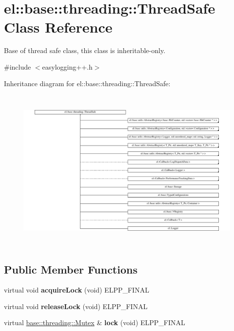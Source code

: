 \hypertarget{classel_1_1base_1_1threading_1_1ThreadSafe}{\section{el\-:\-:base\-:\-:threading\-:\-:Thread\-Safe Class Reference}
\label{classel_1_1base_1_1threading_1_1ThreadSafe}
}


Base of thread safe class, this class is inheritable-\/only.  




{\ttfamily \#include $<$easylogging++.\-h$>$}

Inheritance diagram for el\-:\-:base\-:\-:threading\-:\-:Thread\-Safe\-:\begin{figure}[H]
\begin{center}
\leavevmode
\includegraphics[height=8.203125cm]{classel_1_1base_1_1threading_1_1ThreadSafe}
\end{center}
\end{figure}
\subsection*{Public Member Functions}
\begin{DoxyCompactItemize}
\item 
\hypertarget{classel_1_1base_1_1threading_1_1ThreadSafe_a59db719b214f7118f0919846a85077bf}{virtual void {\bfseries acquire\-Lock} (void) E\-L\-P\-P\-\_\-\-F\-I\-N\-A\-L}\label{classel_1_1base_1_1threading_1_1ThreadSafe_a59db719b214f7118f0919846a85077bf}

\item 
\hypertarget{classel_1_1base_1_1threading_1_1ThreadSafe_a95bb166242b9691f861274a9b8ced2d9}{virtual void {\bfseries release\-Lock} (void) E\-L\-P\-P\-\_\-\-F\-I\-N\-A\-L}\label{classel_1_1base_1_1threading_1_1ThreadSafe_a95bb166242b9691f861274a9b8ced2d9}

\item 
\hypertarget{classel_1_1base_1_1threading_1_1ThreadSafe_affb45b35790a7305d0a659562c8104fc}{virtual \hyperlink{classel_1_1base_1_1threading_1_1internal_1_1NoMutex}{base\-::threading\-::\-Mutex} \& {\bfseries lock} (void) E\-L\-P\-P\-\_\-\-F\-I\-N\-A\-L}\label{classel_1_1base_1_1threading_1_1ThreadSafe_affb45b35790a7305d0a659562c8104fc}

\end{DoxyCompactItemize}


